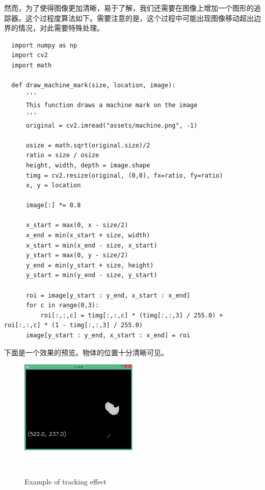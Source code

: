 然而，为了使得图像更加清晰，易于了解，我们还需要在图像上增加一个图形的追踪器。这个过程度算法如下。需要注意的是，这个过程中可能出现图像移动超出边界的情况，对此需要特殊处理。
\begin{verbatim}
  import numpy as np
  import cv2
  import math

  def draw_machine_mark(size, location, image):
      '''
      This function draws a machine mark on the image
      '''
      original = cv2.imread("assets/machine.png", -1)

      osize = math.sqrt(original.size)/2
      ratio = size / osize
      height, width, depth = image.shape
      timg = cv2.resize(original, (0,0), fx=ratio, fy=ratio)
      x, y = location 

      image[:] *= 0.8

      x_start = max(0, x - size/2)
      x_end = min(x_start + size, width)
      x_start = min(x_end - size, x_start)
      y_start = max(0, y - size/2)
      y_end = min(y_start + size, height)
      y_start = min(y_end - size, y_start)
      
      roi = image[y_start : y_end, x_start : x_end]
      for c in range(0,3):
          roi[:,:,c] = timg[:,:,c] * (timg[:,:,3] / 255.0) + roi[:,:,c] * (1 - timg[:,:,3] / 255.0) 
      image[y_start : y_end, x_start : x_end] = roi
\end{verbatim}
下面是一个效果的预览。物体的位置十分清晰可见。\\
\begin{figure}[h!]

  \centering
    \includegraphics[width=0.5\textwidth]{../Pictures/after.png}
    \caption{Example of tracking effect}\\
\end{figure}

